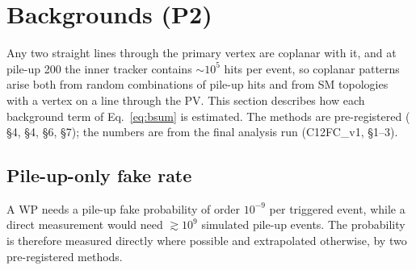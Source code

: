 \section{Backgrounds (P2)}\label{sec:bkg}

Any two straight lines through the primary vertex are coplanar with it, and at pile-up 200 the inner tracker contains
$\sim10^5$ hits per event, so coplanar patterns arise both from random combinations of pile-up hits and from SM
topologies with a vertex on a line through the PV. This section describes how each background term of
Eq.~\eqref{eq:bsum} is estimated. The methods are pre-registered ( \S4,  \S4, \S6, \S7);
the numbers are from the final analysis run (C12FC\_v1,  \S1--3).

\subsection{Pile-up-only fake rate}\label{sec:bkg:pu}
A WP needs a pile-up fake probability of order $10^{-9}$ per triggered event, while a direct measurement would need
$\gtrsim10^9$ simulated pile-up events. The probability is therefore measured directly where possible and extrapolated
otherwise, by two pre-registered methods.

